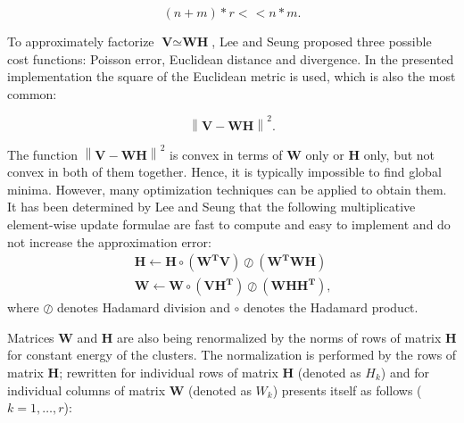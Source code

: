 \documentclass[3p, 12pt]{elsarticle} %
\newcommand{\norm}[1]{\left\lVert#1\right\rVert}
\begin{document}
\begin{equation}\label{r1}
    (n+m)*r<\hspace{1pt}< n*m .
\end{equation}

To approximately factorize $\textbf{V}\simeq{\textbf{W}\textbf{H}}$, Lee and Seung proposed three possible cost functions: Poisson error, Euclidean distance and divergence. In the presented implementation the square of the Euclidean metric is used, which is also the most common:

\begin{equation}
    \norm{\textbf{V}-\textbf{WH}}^2.
\end{equation}

The function $\norm{\textbf{V}-\textbf{WH}}^2$ is convex in terms of \textbf{W} only or \textbf{H} only, but not convex in both of them together. Hence, it is typically impossible to find global minima. However, many optimization techniques can be applied to obtain them. It has been determined by Lee and Seung that the following multiplicative element-wise update formulae are fast to compute and easy to implement and do not increase the approximation error:
\begin{equation}
\begin{array}{ll}
     &\mathbf{H} \leftarrow \mathbf{H}\circ(\mathbf{W^TV})\oslash
(\mathbf{W^TWH}) \quad  \\
     & \mathbf{W} \leftarrow \mathbf{W}\circ(\mathbf{VH^T})\oslash(\mathbf{WHH^T}),
\end{array}
\end{equation}
where $\oslash$ denotes Hadamard division and $\circ$ denotes the Hadamard product. 


Matrices \textbf{W} and \textbf{H} are also being renormalized by the norms of rows of matrix \textbf{H} for constant energy of the clusters. The normalization is performed by the rows of matrix \textbf{H};  rewritten for individual rows of matrix \textbf{H} (denoted as ${H_{k}}$) and for individual columns of matrix \textbf{W}  (denoted as ${W_{k}}$) presents itself as follows ($k=1, \dots, r$):
\end{document}
